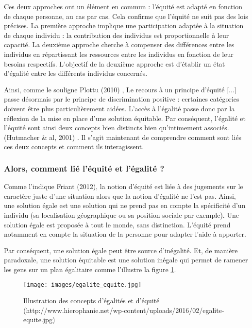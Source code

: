 Ces deux approches ont un élément en commun : l'équité est adapté en fonction de chaque personne, au cas par cas. Cela confirme que l'équité ne suit pas des lois précises. La première approche implique une participation adaptée à la situation de chaque individu : la contribution des individus est proportionnelle à leur capacité. La deuxième approche cherche à compenser des différences entre les individus en répartissant les ressources entre les individus en fonction de leur besoins respectifs. L'objectif de la deuxième approche est d'établir un état d'égalité entre les différents individus concernés.

Ainsi, comme le souligne Plottu (2010) \cite{Plottu2010}, \og Le recours à un principe d'équité [...] passe désormais par le principe de discrimination positive : certaines catégories doivent être plus particulièrement aidées\fg{}. L'accès à l'égalité passe donc par la réflexion de la mise en place d'une solution équitable. Par conséquent, \og l'égalité et l'équité sont ainsi deux concepts bien distincts bien qu'intimement associés.\fg{} (Hutmacher \& al, 2001) \cite{Hutmacher2001}. Il s'agit maintenant de comprendre comment sont liés ces deux concepts et comment ils interagissent.

\subsubsection{Alors, comment lié l'équité et l'égalité ? }

Comme l'indique Friant (2012), la notion d'équité est liée à des jugements sur le caractère juste d'une situation alors que la notion d'égalité ne l'est pas. Ainsi, une solution égale est une solution qui ne prend pas en compte la spécificité d'un individu (sa localisation géographique ou sa position sociale par exemple). Une solution égale est proposée à tout le monde, sans distinction. L'équité prend notamment en compte la situation de la personne pour adapter l'aide à apporter.

Par conséquent, une solution égale peut être source d'inégalité. Et, de manière paradoxale, une solution équitable est une solution inégale qui permet de ramener les gens sur un plan égalitaire comme l'illustre la figure \ref{EgaliteVsEquite}.

\begin{figure}[htbp]
\begin{center}
\texttt{[image: images/egalite\_equite.jpg]} 
\end{center}
\caption{Illustration des concepts d'égalités et d'équité (http://www.hierophanie.net/wp-content/uploads/2016/02/egalite-equite.jpg)}
\label{EgaliteVsEquite}
\end{figure}

